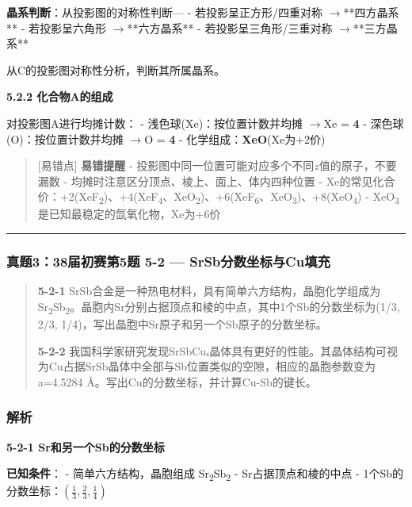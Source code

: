 \documentclass[a4paper,11pt]{ctexart}
\newcommand{\箭}{\ensuremath{\rightarrow}}
\newcommand{\左箭}{\ensuremath{\leftarrow}}
\newcommand{\上箭}{\ensuremath{\uparrow}}
\newcommand{\下箭}{\ensuremath{\downarrow}}
\newcommand{\衡}{\ensuremath{\rightleftharpoons}}
\newcommand{\双箭}{\ensuremath{\leftrightarrow}}
\newcommand{\约等于}{\ensuremath{\approx}}
\newcommand{\小于等于}{\ensuremath{\leq}}
\newcommand{\大于等于}{\ensuremath{\geq}}
\newcommand{\不等于}{\ensuremath{\neq}}
\newcommand{\西格马}{\ensuremath{\sigma}}
\newcommand{\派}{\ensuremath{\pi}}
\begin{document}
\textbf{晶系判断}：从投影图的对称性判断---
- 若投影呈正方形/四重对称 \箭 **四方晶系**
- 若投影呈六角形 \箭 **六方晶系**
- 若投影呈三角形/三重对称 \箭 **三方晶系**

从C的投影图对称性分析，判断其所属晶系。

\textbf{5.2.2 化合物A的组成}

对投影图A进行均摊计数：
- 浅色球(Xe)：按位置计数并均摊 \箭 Xe = \textbf{4}
- 深色球(O)：按位置计数并均摊 \箭 O = \textbf{4}
- 化学组成：\textbf{XeO}(Xe为+2价)

\begin{quote}
{[}易错点{]} \textbf{易错提醒}
- 投影图中同一位置可能对应多个不同\(z\)值的原子，不要漏数
- 均摊时注意区分顶点、棱上、面上、体内四种位置
- Xe的常见化合价：+2(XeF\textsubscript{2})、+4(XeF\textsubscript{4}、XeO\textsubscript{2})、+6(XeF\textsubscript{6}、XeO\textsubscript{3})、+8(XeO\textsubscript{4})
- XeO\textsubscript{3}是已知最稳定的氙氧化物，Xe为+6价
\end{quote}

\begin{center}\rule{0.5\linewidth}{0.5pt}\end{center}

\subsubsection{真题3：38届初赛第5题 5-2 --- SrSb分数坐标与Cu填充}\label{ux771fux9898338ux5c4aux521dux8d5bux7b2c5ux9898-5-2-srsbux5206ux6570ux5750ux6807ux4e0ecuux586bux5145}

\begin{quote}
\textbf{5-2-1} SrSb合金是一种热电材料，具有简单六方结构，晶胞化学组成为Sr\textsubscript{2}Sb\textsubscript{2}。晶胞内Sr分别占据顶点和棱的中点，其中1个Sb的分数坐标为(1/3, 2/3, 1/4)，写出晶胞中Sr原子和另一个Sb原子的分数坐标。

\textbf{5-2-2} 我国科学家研究发现SrSbCuₓ晶体具有更好的性能。其晶体结构可视为Cu占据SrSb晶体中全部与Sb位置类似的空隙，相应的晶胞参数变为a=4.5284 Å。写出Cu的分数坐标，并计算Cu-Sb的键长。
\end{quote}

\subsubsection{解析}\label{ux89e3ux6790-16}

\textbf{5-2-1 Sr和另一个Sb的分数坐标}

\textbf{已知条件}：
- 简单六方结构，晶胞组成 Sr\textsubscript{2}Sb\textsubscript{2}
- Sr占据顶点和棱的中点
- 1个Sb的分数坐标：\((\frac{1}{3}, \frac{2}{3}, \frac{1}{4})\)
\end{document}
